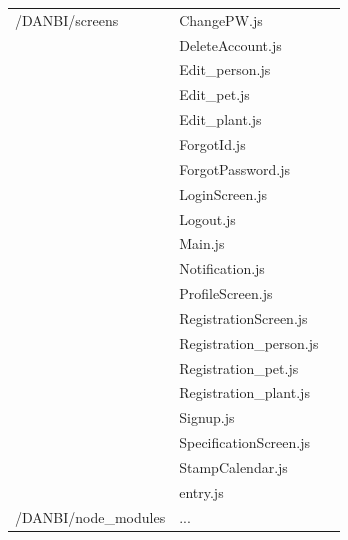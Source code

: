 \documentclass[conference]{IEEEtran}
\begin{document}
\begin{table}[h!]
\begin{threeparttable}
\begin{tabular}{p{2.4cm}p{2.8cm}p{2cm}}
            \hline
            /DANBI/screens 
            & ChangePW.js\\
            & DeleteAccount.js\\
            & Edit\_person.js\\
            & Edit\_pet.js\\
            & Edit\_plant.js\\
            & ForgotId.js\\
            & ForgotPassword.js\\
            & LoginScreen.js\\
            & Logout.js\\
            & Main.js\\
            & Notification.js\\
            & ProfileScreen.js\\
            & RegistrationScreen.js\\
            & Registration\_person.js\\
            & Registration\_pet.js\\
            & Registration\_plant.js\\
            & Signup.js\\
            & SpecificationScreen.js\\
            & StampCalendar.js\\
            & entry.js\\
            \hline
            /DANBI/node\_modules& ...\\
            \bottomrule
            \end{tabular}
        \end{threeparttable}
    \end{table}
    
\end{document}
